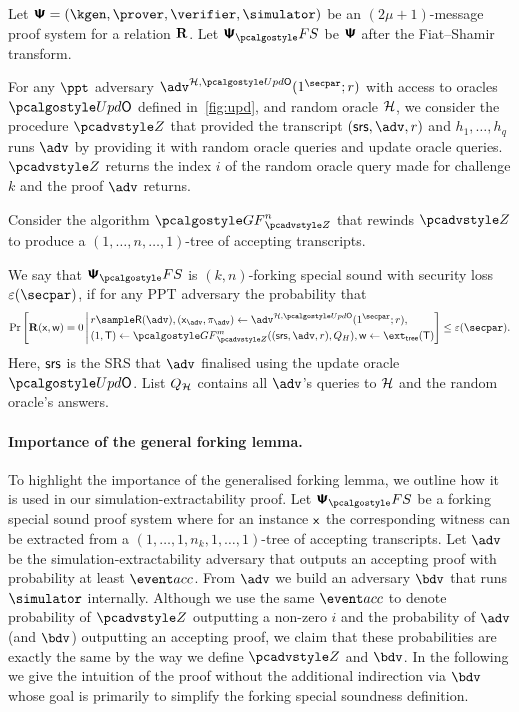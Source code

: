 \begin{definition}
	Let $\proofsystem = (\kgen, \prover, \verifier, \simulator)$ be an
	$(2 \mu + 1)$-message proof system for a relation $\mathbf{R}$.  Let $\proofsystem_\fs$ be
	$\bm{\mathsf{\Psi}}$ after the Fiat--Shamir transform.
	
	For any $\ppt$ adversary $\advse^{\ro, \initU} (1^\secpar; r)$ with access to oracles $\initU$ defined in~\cref{fig:upd}, and random oracle $\mathcal{H}$, we consider the procedure $\zdv$ that provided the transcript $(\srs, \adv, r)$ and $h_1, \ldots, h_q$ runs $\adv$ by providing it with random oracle queries
	and update oracle queries.
	$\zdv$ returns the index $i$ of the
	random oracle query made for challenge $k$ and the proof $\adv$ returns.
	
	Consider the algorithm $\genforking_{\zdv}^{n}$
	that rewinds $\zdv$ to produce a $(1,\dots, n, \dots, 1)$-tree of
	accepting transcripts.
	
	We say that $\psfs$ is $(k,n)$-forking special sound with security loss $\eps(\secpar)$, if
	for any PPT adversary the probability that
	\begin{align*}
	\Pr\left[
	\REL(\inp, \wit) = 0
	\,\Biggl|\,
	\begin{aligned}
	& r \sample \RND{\advse},
	(\inp_{\advse}, \zkproof_{\advse}) \gets \advse^{\ro, \initU} (1^\secpar; r), \\
	&    (1, \tree) \gets \genforking_{\zdv}^{m}((\srs,\adv,r),Q_{H}),
	\wit \gets \extt(\tree)
	\end{aligned}
	\right] \leq \eps(\secpar).
	\end{align*}
	Here, $\mathsf{srs}$ is the SRS that $\advse$ finalised using the update oracle $\initU$.
	List $Q_{\mathcal{H}}$ contains all $\advse$'s
	queries to $\mathcal{H}$ and the random oracle's answers.
\end{definition}


\paragraph{Importance of the general forking lemma.}
To highlight the importance of the generalised forking lemma, we outline how it is used in
our simulation-extractability proof.  Let $\psfs$ be a forking special sound proof system
where for an instance $\mathsf{x}$ the corresponding witness can be extracted from a
$(1, \ldots, 1, n_k, 1, \ldots, 1)$-tree of accepting transcripts.  Let $\adv$ be the
simulation-extractability adversary that outputs an accepting proof with probability at
least $\accProb$. From $\adv$ we build an adversary $\bdv$ that runs $\simulator$
internally. Although we use the same $\accProb$ to denote probability of $\zdv$ outputting a
non-zero $i$ and the probability of $\adv$ (and $\bdv$) outputting an accepting proof, we
claim that these probabilities are exactly the same by the way we define $\zdv$ and
$\bdv$. In the following we give the intuition of the proof without the additional
indirection via $\bdv$ whose goal is primarily to simplify the forking special soundness
definition.

